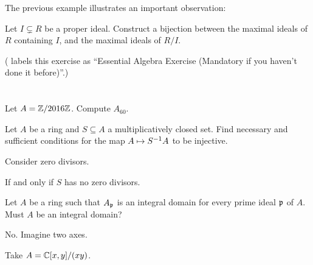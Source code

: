 
The previous example illustrates an important observation:
\begin{exercise}
	Let $I \subsetneq R$ be a proper ideal.
	Construct a bijection between the maximal ideals of $R$ containing $I$,
	and the maximal ideals of $R/I$.
\end{exercise}
(\cite{ref:vakil} labels this exercise as
``Essential Algebra Exercise (Mandatory if you haven't done it before)''.)


\section{\problemhead}

\begin{problem}
	Let $A = \mathbb Z/2016\mathbb Z$. Compute $A_{60}$.
\end{problem}

\begin{problem}
	Let $A$ be a ring and $S \subseteq A$ a multiplicatively closed set.
	Find necessary and sufficient conditions
	for the map $A \mapsto S^{-1} A$ to be injective.
	\begin{hint}
		Consider zero divisors.
	\end{hint}
	\begin{sol}
		If and only if $S$ has no zero divisors.
	\end{sol}
\end{problem}

\begin{problem}
	Let $A$ be a ring such that $A_\mathfrak p$ is an integral domain
	for every prime ideal $\mathfrak p$ of $A$.
	Must $A$ be an integral domain?
	\begin{hint}
		No. Imagine two axes.
	\end{hint}
	\begin{sol}
		Take $A = \mathbb C[x,y] / (xy)$.
	\end{sol}
\end{problem}
